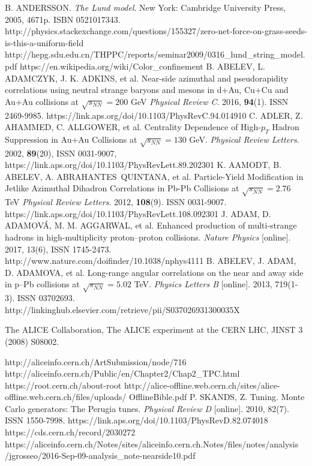 \documentclass[thesismargins, thesislinespacing]{rnthesis}
\begin{document}
\begin{thebibliography}{}
B. ANDERSSON. \textit{The Lund model}. New York: Cambridge University Press, 2005, 4671p. ISBN 0521017343.
http://physics.stackexchange.com/questions/155327/zero-net-force-on-grass-seeds-is-this-a-uniform-field
http://hepg.sdu.edu.cn/THPPC/reports/seminar2009/0316\_lund\_string\_model.pdf
https://en.wikipedia.org/wiki/Color\_confinement
B. ABELEV, L. ADAMCZYK, J. K. ADKINS, et al. Near-side azimuthal and pseudorapidity correlations using neutral strange baryons and mesons in d+Au, Cu+Cu and Au+Au collisions at $\sqrt{s_{NN}}=200$ GeV \textit{Physical Review C}. 2016, \textbf{94}(1). ISSN 2469-9985. https://link.aps.org/doi/10.1103/PhysRevC.94.014910
C. ADLER, Z. AHAMMED, C. ALLGOWER, et al. Centrality Dependence of High-$p_T$ Hadron Suppression in Au+Au Collisions at $\sqrt{s_{NN}} = 130$ GeV. \textit{Physical Review Letters}. 2002, \textbf{89}(20), ISSN 0031-9007, https://link.aps.org/doi/10.1103/PhysRevLett.89.202301
K. AAMODT, B. ABELEV, A. ABRAHANTES QUINTANA, et al. Particle-Yield Modification in Jetlike Azimuthal Dihadron Correlations in Pb-Pb Collisions at $\sqrt{s_{NN}} = 2.76$ TeV \textit{Physical Review Letters}. 2012, \textbf{108}(9). ISSN 0031-9007. https://link.aps.org/doi/10.1103/PhysRevLett.108.092301
J. ADAM, D. ADAMOVÁ, M. M. AGGARWAL, et al. Enhanced production of multi-strange hadrons in high-multiplicity proton–proton collisions. \textit{Nature Physics }[online]. 2017, 13(6), ISSN 1745-2473. http://www.nature.com/doifinder/10.1038/nphys4111
B. ABELEV, J. ADAM, D. ADAMOVA, et al. Long-range angular correlations on the near and away side in p–Pb collisions at $\sqrt{s_{NN}}=5.02$ TeV. \textit{Physics Letters B} [online]. 2013, 719(1-3). ISSN 03702693. http://linkinghub.elsevier.com/retrieve/pii/S037026931300035X

The ALICE Collaboration, The ALICE experiment at the CERN LHC, JINST 3 (2008) S08002.

http://aliceinfo.cern.ch/ArtSubmission/node/716
http://aliceinfo.cern.ch/Public/en/Chapter2/Chap2\_TPC.html
https://root.cern.ch/about-root 
http://alice-offline.web.cern.ch/sites/alice-offline.web.cern.ch/files/uploads/ \- OfflineBible.pdf
P. SKANDS, Z. Tuning. Monte Carlo generators: The Perugia tunes. \textit{Physical Review D }[online]. 2010, 82(7). ISSN 1550-7998. https://link.aps.org/doi/10.1103/PhysRevD.82.074018
 https://cds.cern.ch/record/2030272
 https://aliceinfo.cern.ch/Notes/sites/aliceinfo.cern.ch.Notes/files/notes/analysis\\/jgrosseo/2016-Sep-09-analysis\_note-nearside10.pdf

\end{thebibliography}
%
\end{document}
